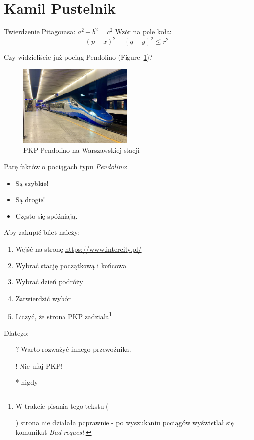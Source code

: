 \section{Kamil Pustelnik}
\label{sec:kpust}

Twierdzenie Pitagorasa: $a^2 + b^2 = c^2$
Wzór na pole koła: \[(p - x)^2 + (q - y)^2 \leq r^2\]

Czy widzieliście już pociąg Pendolino (Figure~\ref{fig:pendolino})?

\begin{figure}[htbp]
    \centering
    \includegraphics[width=0.5\textwidth]{pictures/Pendolino.jpg}
    \caption{PKP Pendolino na Warszawskiej stacji}
    \label{fig:pendolino}
\end{figure}

Parę faktów o pociągach typu \emph{Pendolino}:
\begin{itemize}
    \item Są szybkie!
    \item Są drogie!
    \item Często się spóźniają.
\end{itemize}

Aby zakupić bilet należy:
\begin{enumerate}
    \item Wejść na stronę \url{https://www.intercity.pl/}
    \item Wybrać stację początkową i końcowa
    \item Wybrać dzień podróży
    \item Zatwierdzić wybór
    \item Liczyć, że strona PKP zadziała\footnote{W trakcie pisania tego tekstu (\date{25.10.2023}) strona nie działała poprawnie - po wyszukaniu pociągów wyświetlał się komunikat \emph{Bad request}.}
\end{enumerate}

Dlatego:
\begin{itemize}
    \item[?] Warto rozważyć innego przewoźnika.
    \item[!] Nie ufaj PKP!
    \item[*] nigdy
\end{itemize}

